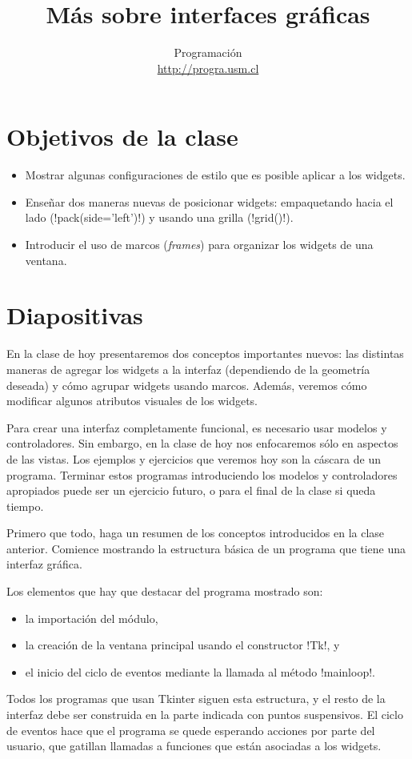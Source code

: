 \documentclass[10pt]{article}
\title{Más sobre interfaces gráficas}
\author{Programación \\ \url{http://progra.usm.cl}}
\date{}
\begin{document}
  \maketitle

  \section*{Objetivos de la clase}
  \begin{itemize}
    \item Mostrar algunas configuraciones de estilo
      que es posible aplicar a los widgets.
    \item Enseñar dos maneras nuevas de posicionar widgets:
      empaquetando hacia el lado (\li!pack(side='left')!)
      y usando una grilla (\li!grid()!).
    \item Introducir el uso de marcos (\emph{frames})
      para organizar los widgets de una ventana.
  \end{itemize}

  \section*{Diapositivas}

  En la clase de hoy presentaremos dos conceptos importantes nuevos:
  las distintas maneras de agregar los widgets a la interfaz
  (dependiendo de la geometría deseada)
  y cómo agrupar widgets usando marcos.
  Además,
  veremos cómo modificar algunos atributos visuales de los widgets.

  Para crear una interfaz completamente funcional,
  es necesario usar modelos y controladores.
  Sin embargo,
  en la clase de hoy nos enfocaremos sólo
  en aspectos de las vistas.
  Los ejemplos y ejercicios que veremos hoy
  son la cáscara de un programa.
  Terminar estos programas introduciendo los modelos y controladores apropiados
  puede ser un ejercicio futuro, o para el final de la clase si queda tiempo.


  Primero que todo,
  haga un resumen de los conceptos introducidos en la clase anterior.
  Comience mostrando la estructura básica de un programa
  que tiene una interfaz gráfica.

  Los elementos que hay que destacar del programa mostrado son:
  \begin{itemize}
    \item la importación del módulo,
    \item la creación de la ventana principal
      usando el constructor \li!Tk!, y
    \item el inicio del ciclo de eventos
      mediante la llamada al método \li!mainloop!.
  \end{itemize}
  Todos los programas que usan Tkinter
  siguen esta estructura,
  y el resto de la interfaz debe ser construida
  en la parte indicada con puntos suspensivos.
  El ciclo de eventos
  hace que el programa se quede esperando
  acciones por parte del usuario,
  que gatillan llamadas a funciones
  que están asociadas a los widgets.
\end{document}
